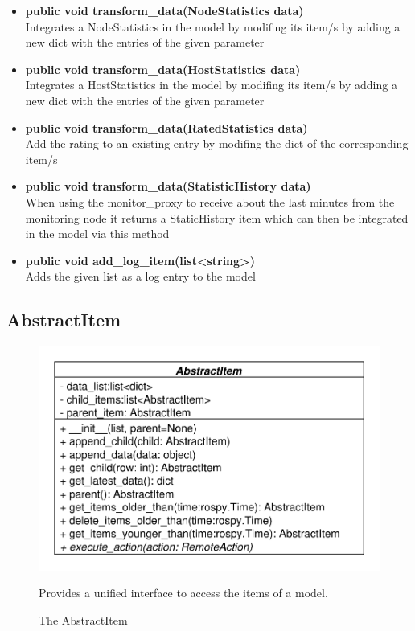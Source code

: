 \begin{itemize}
  \item \textbf{public void transform\_data(NodeStatistics data)}\\ 
  Integrates a NodeStatistics in the model by modifing its item/s by adding a new dict with the entries of the given parameter
  \item \textbf{public void transform\_data(HostStatistics data)}\\ 
  Integrates a HostStatistics in the model by modifing its item/s by adding a new dict with the entries of the given parameter
  \item \textbf{public void transform\_data(RatedStatistics data)}\\ 
  Add the rating to an existing entry by modifing the dict of the corresponding
  item/s
  \item \textbf{public void transform\_data(StatisticHistory data)}\\ 
  When using the monitor\_proxy to receive about the last minutes from the monitoring node
  it returns a StaticHistory item which can then be integrated in the model via this method
  \item\textbf{public void add\_log\_item(list<string>)}\\
  Adds the given list as a log entry to the model
  \end{itemize}

\subsection{AbstractItem}
\begin{figure}[htbp]
	\begin{minipage}[t]{7cm}
		\vspace{0pt}
		\centering
		\includegraphics[scale=0.6]{./diagram_pictures/AbstractItem.pdf}
		\caption{The AbstractItem}
	\end{minipage}
	\hfill
	\begin{minipage}[t]{6cm}
		\vspace{10pt}		
		Provides a unified interface to access the items of a model.
	\end{minipage}
\end{figure}
